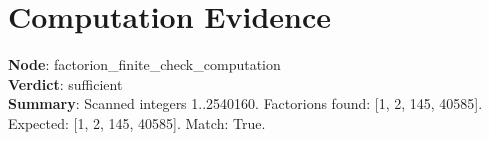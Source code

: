 \section*{Computation Evidence}
\textbf{Node}: factorion_finite_check_computation\\
\textbf{Verdict}: sufficient\\
\textbf{Summary}: Scanned integers 1..2540160. Factorions found: [1, 2, 145, 40585]. Expected: [1, 2, 145, 40585]. Match: True.

